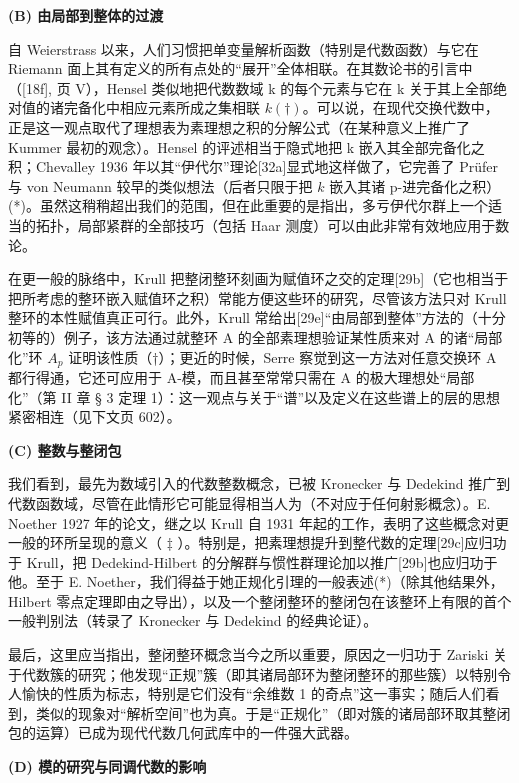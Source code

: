 \textbf{(B) 由局部到整体的过渡}\par

自 Weierstrass 以来，人们习惯把单变量解析函数（特别是代数函数）与它在 Riemann 面上其有定义的所有点处的“展开”全体相联。在其数论书的引言中（{[}18f{]}, 页 V），Hensel 类似地把代数数域 k 的每个元素与它在 k 关于其上全部绝对值的诸完备化中相应元素所成之集相联 \(k (\dagger)\)。可以说，在现代交换代数中，正是这一观点取代了理想表为素理想之积的分解公式（在某种意义上推广了 Kummer 最初的观念）。Hensel 的评述相当于隐式地把 k 嵌入其全部完备化之积；Chevalley 1936 年以其“伊代尔”理论{[}32a{]}显式地这样做了，它完善了 Prüfer 与 von Neumann 较早的类似想法（后者只限于把 \(k\) 嵌入其诸 p-进完备化之积）(*)。虽然这稍稍超出我们的范围，但在此重要的是指出，多亏伊代尔群上一个适当的拓扑，局部紧群的全部技巧（包括 Haar 测度）可以由此非常有效地应用于数论。

在更一般的脉络中，Krull 把整闭整环刻画为赋值环之交的定理{[}29b{]}（它也相当于把所考虑的整环嵌入赋值环之积）常能方便这些环的研究，尽管该方法只对 Krull 整环的本性赋值真正可行。此外，Krull 常给出{[}29e{]}“由局部到整体”方法的（十分初等的）例子，该方法通过就整环 A 的全部素理想验证某性质来对 A 的诸“局部化”环 \(A_{p}\) 证明该性质（†）；更近的时候，Serre 察觉到这一方法对任意交换环 A 都行得通，它还可应用于 A-模，而且甚至常常只需在 A 的极大理想处“局部化”（第 II 章 § 3 定理 1）：这一观点与关于“谱”以及定义在这些谱上的层的思想紧密相连（见下文页 602）。

\textbf{(C) 整数与整闭包}\par

我们看到，最先为数域引入的代数整数概念，已被 Kronecker 与 Dedekind 推广到代数函数域，尽管在此情形它可能显得相当人为（不对应于任何射影概念）。E. Noether 1927 年的论文，继之以 Krull 自 1931 年起的工作，表明了这些概念对更一般的环所呈现的意义（ \(\ddagger\) ）。特别是，把素理想提升到整代数的定理{[}29c{]}应归功于 Krull，把 Dedekind-Hilbert 的分解群与惯性群理论加以推广{[}29b{]}也应归功于他。至于 E. Noether，我们得益于她正规化引理的一般表述(*)（除其他结果外，Hilbert 零点定理即由之导出），以及一个整闭整环的整闭包在该整环上有限的首个一般判别法（转录了 Kronecker 与 Dedekind 的经典论证）。

最后，这里应当指出，整闭整环概念当今之所以重要，原因之一归功于 Zariski 关于代数簇的研究；他发现“正规”簇（即其诸局部环为整闭整环的那些簇）以特别令人愉快的性质为标志，特别是它们没有“余维数 1 的奇点”这一事实；随后人们看到，类似的现象对“解析空间”也为真。于是“正规化”（即对簇的诸局部环取其整闭包的运算）已成为现代代数几何武库中的一件强大武器。

\textbf{(D) 模的研究与同调代数的影响}\par


